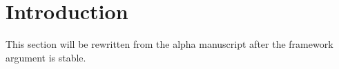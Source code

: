 \section{Introduction}

This section will be rewritten from the alpha manuscript after the framework argument is stable.
